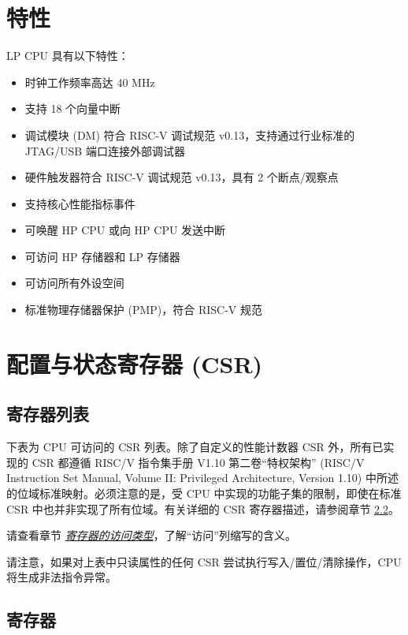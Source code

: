 \documentclass[main\_\_CN.tex]{subfiles}
\begin{document}
\section{特性}
\label{sec:ulp-features}

LP CPU 具有以下特性：

\begin{itemize}
    \item 时钟工作频率高达 40 MHz
    \item 支持 18 个向量中断
    \item 调试模块 (DM) 符合 RISC-V 调试规范 v0.13，支持通过行业标准的 JTAG/USB 端口连接外部调试器
    \item 硬件触发器符合 RISC-V 调试规范 v0.13，具有 2 个断点/观察点
    \item 支持核心性能指标事件
    \item 可唤醒 HP CPU 或向 HP CPU 发送中断
    \item 可访问 HP 存储器和 LP 存储器
    \item 可访问所有外设空间
    \item 标准物理存储器保护 (PMP)，符合 RISC-V 规范
\end{itemize}


\section{配置与状态寄存器 (CSR)}
\hypertarget{ulp-reg-summ}{}
\subsection{寄存器列表}
\label{sec:ulp-reg-summ}


下表为 CPU 可访问的 CSR 列表。除了自定义的性能计数器 CSR 外，所有已实现的 CSR 都遵循 RISC\-/V 指令集手册 V1.10 第二卷“特权架构” (RISC\-/V Instruction Set Manual, Volume II: Privileged Architecture, Version 1.10) 中所述的位域标准映射。必须注意的是，受 CPU 中实现的功能子集的限制，即使在标准 CSR 中也并非实现了所有位域。有关详细的 CSR 寄存器描述，请参阅章节 \ref{sec:ulp-reg}。

请查看章节 \hyperref[glossary-access-types]{\textit{寄存器的访问类型}}，了解“访问”列缩写的含义。



请注意，如果对上表中只读属性的任何 CSR 尝试执行写入/置位/清除操作，CPU 将生成非法指令异常。

\subsection{寄存器}
\label{sec:ulp-reg}
\end{document}
